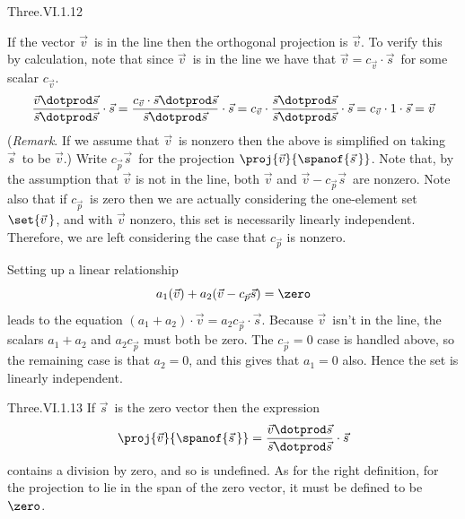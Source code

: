 \begin{ans}{Three.VI.1.12}
      \begin{exparts}
       \partsitem If the vector $\vec{v}\,$ is in the line then the
         orthogonal projection is \( \vec{v} \).
         To verify this
         by calculation, note that since $\vec{v}\,$ is in the line
         we have that \( \vec{v}=c_{\vec{v}}\cdot\vec{s}\, \) for some scalar
         $c_{\vec{v}}$.
         \begin{equation*}
           \frac{\vec{v}\dotprod\vec{s}}{\vec{s}\dotprod\vec{s}}\cdot\vec{s}
           =\frac{c_{\vec{v}}\cdot \vec{s}\dotprod\vec{s}}{%
                         \vec{s}\dotprod\vec{s}}\cdot\vec{s}
           =c_{\vec{v}}\cdot\frac{\vec{s}\dotprod\vec{s}}{%
                                  \vec{s}\dotprod\vec{s}}\cdot\vec{s}
           =c_{\vec{v}}\cdot 1 \cdot\vec{s}
           =\vec{v}
         \end{equation*}
          (\textit{Remark}.
          If we assume that $\vec{v}\,$ is nonzero then the above is
          simplified on taking $\vec{s}\,$ to be $\vec{v}$.)
       \partsitem Write $c_{\vec{p}}\vec{s}\,$ for the projection
         $\proj{\vec{v}}{\spanof{\vec{s}\,}}$.
         Note that, by the assumption that $\vec{v}$ is not in the line,
         both $\vec{v}$ and $\vec{v}-c_{\vec{p}}\vec{s}\,$ are nonzero.
         Note also that if $c_{\vec{p}}\,$ is zero then we are actually
         considering the one-element set $\set{\vec{v}\,}$,
         and with $\vec{v}$ nonzero, this set
         is necessarily linearly independent.
         Therefore, we are left considering the case that
         $c_{\vec{p}}$ is nonzero.

         Setting up a linear relationship
         \begin{equation*}
           a_1(\vec{v})+a_2(\vec{v}-c_{\vec{p}}\vec{s})=\zero
         \end{equation*}
         leads to the equation
         $(a_1+a_2)\cdot\vec{v}=a_2c_{\vec{p}}\cdot\vec{s}$.
         Because $\vec{v}\,$ isn't in the line, the scalars
         $a_1+a_2$ and $a_2 c_{\vec{p}}$ must both be zero.
         The $c_{\vec{p}}=0$ case is handled above, so
         the remaining case is that $a_2=0$, and
         this gives that $a_1=0$ also.
         Hence the set is linearly independent.
     \end{exparts}
    
\end{ans}
\begin{ans}{Three.VI.1.13}
      If $\vec{s}\,$ is the zero vector then the expression
          \begin{equation*}
            \proj{\vec{v}}{\spanof{\vec{s}\,}}=
            \frac{ \vec{v}\dotprod\vec{s} }{%
                    \vec{s}\dotprod\vec{s} }\cdot\vec{s}
          \end{equation*}
      contains a division by zero, and so is undefined.
      As for the right definition,
      for the projection to lie in the span of the zero vector, it
      must be defined to be \( \zero \).
    
\end{ans}
